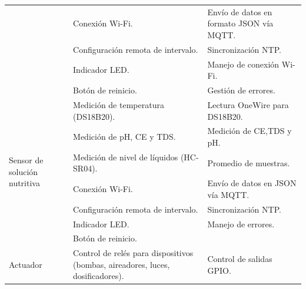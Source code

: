 \begin{table}[H]
\begin{tabular}{p{1.5cm}p{5.4cm}p{5.5cm}}
                                                          & Conexión Wi-Fi.                                                                & Envío de datos en formato JSON vía MQTT.        \\
                                                          & Configuración remota de intervalo.                                             & Sincronización NTP.                             \\
                                                          & Indicador LED.                                                                 & Manejo de conexión Wi-Fi.                       \\
                                                          & Botón de reinicio.                                                             & Gestión de errores.                             \\
        \midrule
        \multirow{7}{1.5cm}{Sensor de solución nutritiva} & Medición de temperatura (DS18B20).                                             & Lectura OneWire para DS18B20.                   \\
                                                          & Medición de pH, CE y TDS.                                                      & Medición de CE,TDS y pH.                        \\
                                                          & Medición de nivel de líquidos (HC-SR04).                                       & Promedio de muestras.                           \\
                                                          & Conexión Wi-Fi.                                                                & Envío de datos en JSON vía MQTT.                \\
                                                          & Configuración remota de intervalo.                                             & Sincronización NTP.                             \\
                                                          & Indicador LED.                                                                 & Manejo de errores.                              \\
                                                          & Botón de reinicio.                                                             &                                                 \\
        \midrule
        \multirow{7}{1.5cm}{Actuador}                     & Control de relés para dispositivos (bombas, aireadores, luces, dosificadores). & Control de salidas GPIO.                        \\

\end{tabular}
\end{table}
